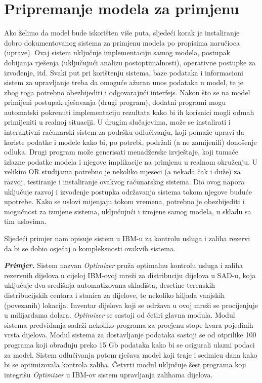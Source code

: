 \documentclass[a4paper, utf8, 11pt, colorlinks]{book}
\begin{document}
\section{Pripremanje modela za primjenu}
Ako želimo da model bude iskorišten više puta, sljedeći  korak je instaliranje dobro dokumentovanog sistema za primjenu modela po propisima naručioca (uprave). Ovaj sistem uključuje implementaciju samog modela, postupak dobijanja rješenja (uključujući analizu postoptimalnosti), operativne postupke za izvođenje, itd. %
Svaki put pri korištenju sistema, baze podataka i informacioni sistem za upravljanje treba da omoguće ažuran unos podataka u model, te je zbog toga potrebno obezbijediti i odgovarajući interfejs. Nakon što se na model primijeni postupak rješavanja (drugi program), dodatni  programi mogu automatski pokrenuti implementaciju rezultata kako bi ih korisnici mogli odmah primijeniti u realnoj situaciji. U drugim slučajevima, može se instalirati i interaktivni računarski sistem  za podršku odlučivanju, koji pomaže upravi da koriste podatke i modele kako bi, po potrebi, podržali (a ne zamijenili)   donošenje odluka. Drugi program može generisati menadžerske izvještaje, koji tumače izlazne podatke modela i njegove implikacije na primjenu u realnom okruženju.  U velikim OR studijama potrebno je nekoliko mjeseci (a nekada čak i duže) za razvoj, testiranje i instaliranje ovakvog računarskog sistema. Dio ovog napora uključuje razvoj i izvođenje postupka održavanja sistema  tokom njegove buduće upotrebe. Kako se uslovi mijenjaju tokom vremena, potrebno je obezbijediti i mogućnost za  izmjene sistema, uključujući i izmjene samog modela, u skladu sa tim uslovima.  

Sljedeći primjer nam opisuje sistem u IBM-u za kontrolu usluga i zaliha rezervi da bi se dobio osjećaj o kompleksnosti ovakvih sistema.  

\textbf{\emph{Primjer.}}
Sistem nazvan \emph{Optimizer} pruža optimalnu kontrolu usluga i zaliha rezervnih dijelova u cijeloj IBM-ovoj mreži za distribuciju dijelova u SAD-u, koja uključuje dva središnja
automatizovana skladišta, desetine terenskih distribucijskih centara i stanica za dijelove, te nekoliko hiljada vanjskih (povezanih) lokacija. Inventar dijelova koji se održava u ovoj mreži se procijenjuje u milijardama dolara. \emph{Optimizer} se sastoji od četiri glavna modula. Modul sistema predviđanja sadrži nekoliko programa za procjenu stope kvara pojedinih vrsta dijelova. Modul sistema za dostavljanje podataka sastoji se od otprilike 100 programa koji    obrađuju
preko 15 Gb podataka kako bi se osigurali ulazni podaci za model. Sistem odlučivanja potom rješava model koji traje i  sedmicu dana kako bi se optimizovala kontrola zaliha. Četvrti modul uključuje šest programa koji integrišu \emph{Optimizer} u IBM-ov sistem upravljanja zalihama dijelova. %
\end{document}
